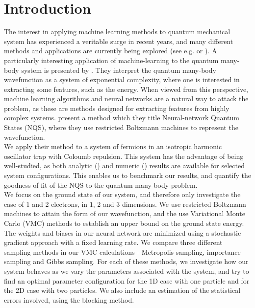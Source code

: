 \documentclass[a4paper, 10pt]{article}
\begin{document}
	\section{Introduction}
	The interest in applying machine learning methods to quantum mechanical system has experienced a veritable surge in recent years, and many different methods and applications are currently being explored (see e.g. \cite{Broecker2017} or \cite{Botu2015}). A particularly interesting application of machine-learning to the quantum many-body system is presented by \cite{Carleo602}. They interpret the quantum many-body wavefunction as a system of exponential complexity, where one is interested in extracting some features, such as the energy. When viewed from this perspective, machine learning algorithms and neural networks are a natural way to attack the problem, as these are methods designed for extracting features from highly complex systems. \cite{Carleo602} present a method which they title Neural-network Quantum States (NQS), where they use restricted Boltzmann machines to represent the wavefunction.\\
	\linebreak
	We apply their method to a system of fermions in an isotropic harmonic oscillator trap with Coloumb repulsion. This system has the advantage of being well-studied, as both analytic (\cite{0305-4470-27-3-040}) and numeric (\cite{PhysRevB.84.115302}) results are available for selected system configurations. This enables us to benchmark our results, and quantify the goodness of fit of the NQS to the quantum many-body problem.\\
	\linebreak
	We focus on the ground state of our system, and therefore only investigate the case of $1$ and $2$ electrons, in $1$, $2$ and $3$ dimensions. We use restricted Boltzmann machines to attain the form of our wavefunction, and the use Variational Monte Carlo (VMC) methods to establish an upper bound on the ground state energy. The weights and biases in our neural network are minimized using a stochastic gradient approach with a fixed learning rate. We compare three different sampling methods in our VMC calculations - Metropolis sampling, importance sampling and Gibbs sampling. For each of these methods, we investigate how our system behaves as we vary the parameters associated with the system, and try to find an optimal parameter configuration for the 1D case with one particle and for the 2D case with two particles. We also include an estimation of the statistical errors involved, using the blocking method.
\end{document}
